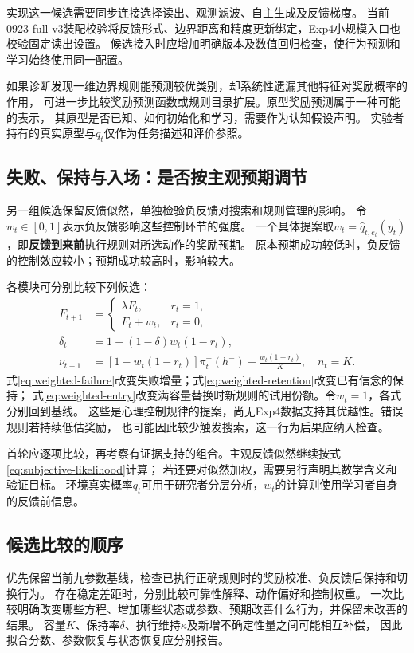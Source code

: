 \documentclass[11pt,a4paper]{article}
\numberwithin{equation}{section}
\begin{document}
实现这一候选需要同步连接选择读出、观测滤波、自主生成及反馈梯度。
当前0923 full-v3装配校验将反馈形式、边界距离和精度更新绑定，Exp4小规模入口也校验固定读出设置。
候选接入时应增加明确版本及数值回归检查，使行为预测和学习始终使用同一配置。

如果诊断发现一维边界规则能预测较优类别，却系统性遗漏其他特征对奖励概率的作用，
可进一步比较奖励预测函数或规则目录扩展。原型奖励预测属于一种可能的表示，
其原型是否已知、如何初始化和学习，需要作为认知假设声明。
实验者持有的真实原型与$q_t$仅作为任务描述和评价参照。

\subsection{失败、保持与入场：是否按主观预期调节}
另一组候选保留反馈似然，单独检验负反馈对搜索和规则管理的影响。
令$w_t\in[0,1]$表示负反馈影响这些控制环节的强度。
一个具体提案取$w_t=\widehat q_{t,e_t}(y_t)$，即\textbf{反馈到来前}执行规则对所选动作的奖励预期。
原本预期成功较低时，负反馈的控制效应较小；预期成功较高时，影响较大。

各模块可分别比较下列候选：
\begin{align}
F_{t+1}&=\begin{cases}\lambda F_t,&r_t=1,\\ F_t+w_t,&r_t=0,\end{cases}
\label{eq:weighted-failure}\\
\delta_t&=1-(1-\delta)w_t(1-r_t),
\label{eq:weighted-retention}\\
\nu_{t+1}&=[1-w_t(1-r_t)]\pi_t^+(h^-)+\frac{w_t(1-r_t)}{K},\quad n_t=K.
\label{eq:weighted-entry}
\end{align}
式\eqref{eq:weighted-failure}改变失败增量；式\eqref{eq:weighted-retention}改变已有信念的保持；
式\eqref{eq:weighted-entry}改变满容量替换时新规则的试用份额。令$w_t=1$，各式分别回到基线。
这些是心理控制规律的提案，尚无Exp4数据支持其优越性。错误规则若持续低估奖励，
也可能因此较少触发搜索，这一行为后果应纳入检查。

首轮应逐项比较，再考察有证据支持的组合。主观反馈似然继续按式\eqref{eq:subjective-likelihood}计算；
若还要对似然加权，需要另行声明其数学含义和验证目标。
环境真实概率$q_t$可用于研究者分层分析，$w_t$的计算则使用学习者自身的反馈前信息。

\subsection{候选比较的顺序}
优先保留当前九参数基线，检查已执行正确规则时的奖励校准、负反馈后保持和切换行为。
存在稳定差距时，分别比较可靠性解释、动作偏好和控制权重。
一次比较明确改变哪些方程、增加哪些状态或参数、预期改善什么行为，并保留未改善的结果。
容量$K$、保持率$\delta$、执行维持$\kappa$及新增不确定性量之间可能相互补偿，
因此拟合分数、参数恢复与状态恢复应分别报告。
\end{document}
